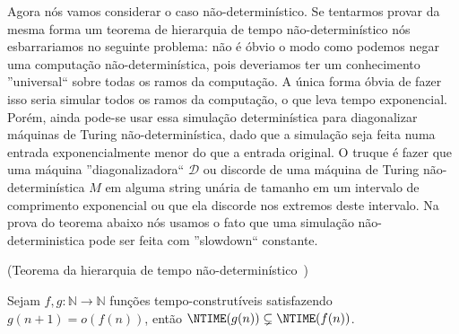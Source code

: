 Agora nós vamos considerar o caso não-determinístico. Se tentarmos provar da mesma forma um teorema de hierarquia de tempo não-determinístico nós esbarrariamos no seguinte problema: não é óbvio o modo como podemos negar uma computação não-determinística, pois deveriamos ter um conhecimento ''universal`` sobre todas os ramos da computação. A única forma óbvia de fazer isso seria simular todos os ramos da computação, o que leva tempo exponencial. Porém, ainda pode-se usar essa simulação determinística para diagonalizar máquinas de Turing não-determinística, dado que a simulação seja feita numa entrada exponencialmente menor do que a entrada original. O truque é fazer que uma máquina ''diagonalizadora`` $\mathcal{D}$ ou discorde de uma máquina de Turing não-determinística $M$ em alguma string unária de tamanho em um intervalo de comprimento exponencial ou que ela discorde nos extremos deste intervalo. Na prova do teorema abaixo nós usamos o fato que uma simulação não-deterministica pode ser feita com ''slowdown`` constante.

\begin{teo} (Teorema da hierarquia de tempo não-determinístico~\cite{cook1973hierarchy})

Sejam $f, g: \mathbb{N} \to \mathbb{N}$ funções tempo-construtíveis satisfazendo $g(n + 1) = o(f(n))$, então $\NTIME(g(n)) \subsetneq \NTIME(f(n))$.

\end{teo}

